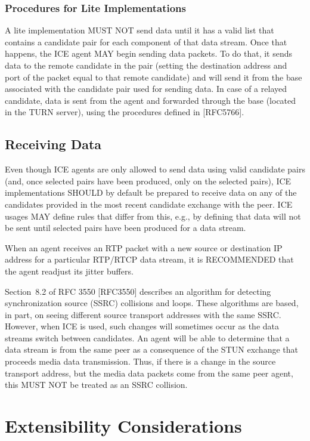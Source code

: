 \documentclass{article}
\begin{document}
\subsubsection{Procedures for Lite Implementations}

A lite implementation MUST NOT send data until it has a valid list that contains a candidate pair for each component of that data stream.  Once that happens, the ICE agent MAY begin sending data packets.  To do that, it sends data to the remote candidate in the pair (setting the destination address and port of the packet equal to that remote candidate) and will send it from the base associated with the candidate pair used for sending data.  In case of a relayed candidate, data is sent from the agent and forwarded through the base (located in the TURN server), using the procedures defined in [RFC5766].

\subsection{Receiving Data}

Even though ICE agents are only allowed to send data using valid candidate pairs (and, once selected pairs have been produced, only on the selected pairs), ICE implementations SHOULD by default be prepared to receive data on any of the candidates provided in the most recent candidate exchange with the peer.  ICE usages MAY define rules that differ from this, e.g., by defining that data will not be sent until selected pairs have been produced for a data stream.

When an agent receives an RTP packet with a new source or destination IP address for a particular RTP/RTCP data stream, it is RECOMMENDED that the agent readjust its jitter buffers.

Section~8.2 of RFC 3550 [RFC3550] describes an algorithm for detecting synchronization source (SSRC) collisions and loops.  These algorithms are based, in part, on seeing different source transport addresses with the same SSRC.  However, when ICE is used, such changes will sometimes occur as the data streams switch between candidates.  An agent will be able to determine that a data stream is from the same peer as a consequence of the STUN exchange that proceeds media data transmission.  Thus, if there is a change in the source transport address, but the media data packets come from the same peer agent, this MUST NOT be treated as an SSRC collision.

\section{Extensibility Considerations}
\end{document}
